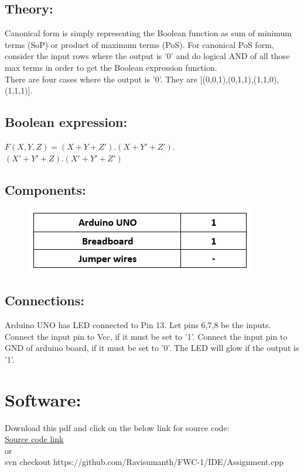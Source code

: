 \documentclass[a4paper,12pt,twocolumn]{article}
\begin{document}
\subsection{Theory:}
Canonical form is simply representing the Boolean function as sum of minimum terms (SoP) or product of maximum terms (PoS). For canonical PoS form, consider the input rows where the output is '0' and do logical AND of all those max terms in order to get the Boolean expression function.\\
There are four cases where the output is '0'. They are [(0,0,1),(0,1,1),(1,1,0),(1,1,1)]. 
\subsection{Boolean expression:}
$F(X,Y,Z)=(X+Y+Z').(X+Y'+Z').$\\$(X'+Y'+Z).(X'+Y'+Z')$

\newpage
\subsection{Components:} 
\begin{figure}[h]
\centering
\includegraphics[width=1\columnwidth]{TT-2-document}
\label{Truth Table}
\end{figure}
\subsection{Connections:}
Arduino UNO has LED connected to Pin 13. Let pins 6,7,8 be the inputs. Connect the input pin to Vcc, if it must be set to '1'. Connect the input pin to GND of arduino board, if it must be set to '0'. The LED will glow if the output is '1'. 
\section{Software:}
Download this pdf and click on the below link for source code:\\
\href{https://raw.githubusercontent.com/Ravisumanth/FWC-1/main/IDE/Assignment.cpp}{Source code link}\\or\\
svn checkout https://github.com/Ravisumanth/FWC-1/IDE/Assignment.cpp
\end{document}
